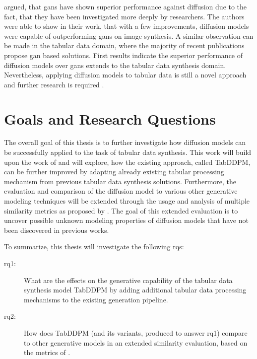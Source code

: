 \cite{dhariwal2021DiffusionModelsBeat} argued, that \glspl{gan} have shown superior performance against diffusion due to the fact, that they have been investigated more deeply by researchers.
The authors were able to show in their work, that with a few improvements, diffusion models were capable of outperforming \glspl{gan} on image synthesis.
A similar observation can be made in the tabular data domain, where the majority of recent publications propose \gls{gan} based solutions.
First results \cite{kotelnikov2022TabDDPMModellingTabular} indicate the superior performance of diffusion models over \glspl{gan} extends to the tabular data synthesis domain.
Nevertheless, applying diffusion models to tabular data is still a novel approach and further research is required \cite{borisov2022DeepNeuralNetworks}.

 
\section{Goals and Research Questions}
\label{ch:intro-goals}
The overall goal of this thesis is to further investigate how diffusion models can be successfully applied to the task of tabular data synthesis.
This work will build upon the work of \cite{kotelnikov2022TabDDPMModellingTabular} and will explore, how the existing approach, called TabDDPM, can be further improved by adapting 
already existing tabular processing mechanism from previous tabular data synthesis solutions.
Furthermore, the evaluation and comparison of the diffusion model to various other generative modeling techniques will be extended through the usage and analysis
of multiple similarity metrics as proposed by \cite{chundawat2022UniversalMetricRobust}.
The goal of this extended evaluation is to uncover possible unknown modeling properties of diffusion models that have not been discovered in previous works.

To summarize, this thesis will investigate the following \glspl{rq}:

\begin{description}
    \item[\gls{rq}1:] What are the effects on the generative capability of the tabular data synthesis model TabDDPM by adding additional tabular data processing mechanisms to the existing generation pipeline.
    \item[\gls{rq}2:] How does TabDDPM (and its variants, produced to answer \gls{rq}1) compare to other generative models in an extended similarity evaluation, based on the metrics of \cite{chundawat2022UniversalMetricRobust}.
\end{description}


